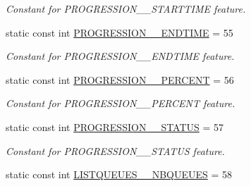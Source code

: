 \begin{DoxyCompactItemize}
\begin{DoxyCompactList}\small\item\em Constant for PROGRESSION\_\-\_\-STARTTIME feature. \item\end{DoxyCompactList}\item 
\hypertarget{classTMS__Data_1_1TMS__DataPackage_a47dd8f66da66e87c63a220605e020e7f}{
static const int \hyperlink{classTMS__Data_1_1TMS__DataPackage_a47dd8f66da66e87c63a220605e020e7f}{PROGRESSION\_\-\_\-ENDTIME} = 55}
\label{classTMS__Data_1_1TMS__DataPackage_a47dd8f66da66e87c63a220605e020e7f}

\begin{DoxyCompactList}\small\item\em Constant for PROGRESSION\_\-\_\-ENDTIME feature. \item\end{DoxyCompactList}\item 
\hypertarget{classTMS__Data_1_1TMS__DataPackage_a7da6d5dea320bd524b6dc6867a0f88cf}{
static const int \hyperlink{classTMS__Data_1_1TMS__DataPackage_a7da6d5dea320bd524b6dc6867a0f88cf}{PROGRESSION\_\-\_\-PERCENT} = 56}
\label{classTMS__Data_1_1TMS__DataPackage_a7da6d5dea320bd524b6dc6867a0f88cf}

\begin{DoxyCompactList}\small\item\em Constant for PROGRESSION\_\-\_\-PERCENT feature. \item\end{DoxyCompactList}\item 
\hypertarget{classTMS__Data_1_1TMS__DataPackage_a09305724694b28295b266834f78e7931}{
static const int \hyperlink{classTMS__Data_1_1TMS__DataPackage_a09305724694b28295b266834f78e7931}{PROGRESSION\_\-\_\-STATUS} = 57}
\label{classTMS__Data_1_1TMS__DataPackage_a09305724694b28295b266834f78e7931}

\begin{DoxyCompactList}\small\item\em Constant for PROGRESSION\_\-\_\-STATUS feature. \item\end{DoxyCompactList}\item 
\hypertarget{classTMS__Data_1_1TMS__DataPackage_a3d3ec7f5a6b355c41c12f040cf7cf3d9}{
static const int \hyperlink{classTMS__Data_1_1TMS__DataPackage_a3d3ec7f5a6b355c41c12f040cf7cf3d9}{LISTQUEUES\_\-\_\-NBQUEUES} = 58}
\label{classTMS__Data_1_1TMS__DataPackage_a3d3ec7f5a6b355c41c12f040cf7cf3d9}


\end{DoxyCompactItemize}
